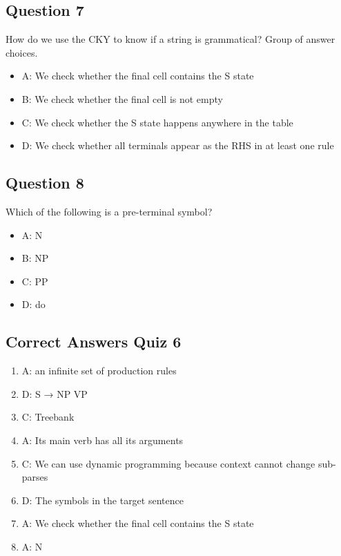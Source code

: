 \documentclass[
  11pt,
  british,
]{article}
\providecommand{\tightlist}{%
  \setlength{\itemsep}{0pt}\setlength{\parskip}{0pt}}
\begin{document}
\hypertarget{question-7-2}{%
\subsection{Question 7}\label{question-7-2}}

How do we use the CKY to know if a string is grammatical? Group of
answer choices.

\begin{itemize}
\tightlist
\item
  A: We check whether the final cell contains the S state
\item
  B: We check whether the final cell is not empty
\item
  C: We check whether the S state happens anywhere in the table
\item
  D: We check whether all terminals appear as the RHS in at least one
  rule
\end{itemize}

\hypertarget{question-8-2}{%
\subsection{Question 8}\label{question-8-2}}

Which of the following is a pre-terminal symbol?

\begin{itemize}
\tightlist
\item
  A: N
\item
  B: NP
\item
  C: PP
\item
  D: do
\end{itemize}

\hypertarget{correct-answers-quiz-6}{%
\subsection{Correct Answers Quiz 6}\label{correct-answers-quiz-6}}

\begin{enumerate}
\def\labelenumi{\arabic{enumi}.}
\tightlist
\item
  A: an infinite set of production rules
\item
  D: S → NP VP
\item
  C: Treebank
\item
  A: Its main verb has all its arguments
\item
  C: We can use dynamic programming because context cannot change
  sub-parses
\item
  D: The symbols in the target sentence
\item
  A: We check whether the final cell contains the S state
\item
  A: N
\end{enumerate}
\end{document}

